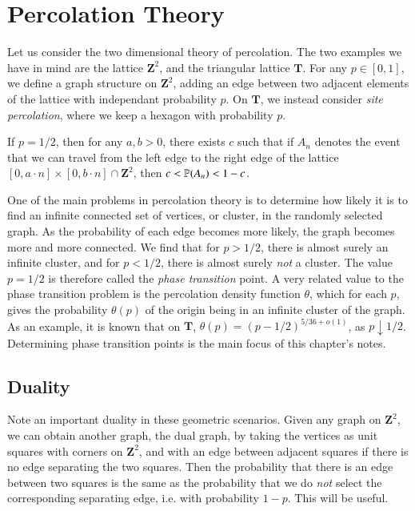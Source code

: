 \chapter{Percolation Theory}

Let us consider the two dimensional theory of percolation. The two examples we have in mind are the lattice $\mathbf{Z}^2$, and the triangular lattice $\mathbf{T}$. For any $p \in [0,1]$, we define a graph structure on $\mathbf{Z}^2$, adding an edge between two adjacent elements of the lattice with independant probability $p$. On $\mathbf{T}$, we instead consider \emph{site percolation}, where we keep a hexagon with probability $p$.

\begin{theorem}
    If $p = 1/2$, then for any $a,b > 0$, there exists $c$ such that if $A_n$ denotes the event that we can travel from the left edge to the right edge of the lattice $[0,a \cdot n] \times [0, b \cdot n] \cap \mathbf{Z}^2$, then $c < \operatorname{\mathbb{P}}(A_n) < 1 - c$.
\end{theorem}

One of the main problems in percolation theory is to determine how likely it is to find an infinite connected set of vertices, or cluster, in the randomly selected graph. As the probability of each edge becomes more likely, the graph becomes more and more connected. We find that for $p > 1/2$, there is almost surely an infinite cluster, and for $p < 1/2$, there is almost surely \emph{not} a cluster. The value $p = 1/2$ is therefore called the \emph{phase transition} point. A very related value to the phase transition problem is the percolation density function $\theta$, which for each $p$, gives the probability $\theta(p)$ of the origin being in an infinite cluster of the graph. As an example, it is known that on $\mathbf{T}$, $\theta(p) = (p - 1/2)^{5/36 + o(1)}$, as $p \downarrow 1/2$. Determining phase transition points is the main focus of this chapter's notes.

\section{Duality}

Note an important duality in these geometric scenarios. Given any graph on $\mathbf{Z}^2$, we can obtain another graph, the dual graph, by taking the vertices as unit squares with corners on $\mathbf{Z}^2$, and with an edge between adjacent squares if there is no edge separating the two squares. Then the probability that there is an edge between two squares is the same as the probability that we do \emph{not} select the corresponding separating edge, i.e. with probability $1 - p$. This will be useful.


